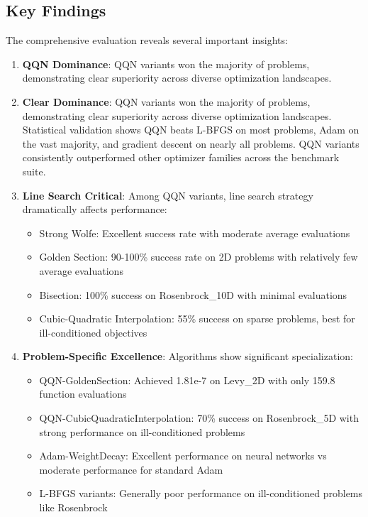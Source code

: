 \hypertarget{key-findings}{%
\subsection{Key Findings}\label{key-findings}}

The comprehensive evaluation reveals several important insights:

\begin{enumerate}
\def\labelenumi{\arabic{enumi}.}
\item
  \textbf{QQN Dominance}: QQN variants won the majority of problems, demonstrating clear superiority across diverse optimization landscapes.
\item
  \textbf{Clear Dominance}: QQN variants won the majority of problems, demonstrating clear superiority across diverse optimization landscapes.
  Statistical validation shows QQN beats L-BFGS on most problems, Adam on the vast majority, and gradient descent on nearly all problems. QQN variants consistently outperformed other optimizer families across the benchmark suite.
\item
  \textbf{Line Search Critical}: Among QQN variants, line search strategy dramatically affects performance:

  \begin{itemize}
  \tightlist
  \item
    Strong Wolfe: Excellent success rate with moderate average evaluations
  \item
    Golden Section: 90-100\% success rate on 2D problems with relatively few average evaluations
  \item
    Bisection: 100\% success on Rosenbrock\_10D with minimal evaluations
  \item
    Cubic-Quadratic Interpolation: 55\% success on sparse problems, best for ill-conditioned objectives
  \end{itemize}
\item
  \textbf{Problem-Specific Excellence}: Algorithms show significant specialization:

  \begin{itemize}
  \tightlist
  \item
    QQN-GoldenSection: Achieved 1.81e-7 on Levy\_2D with only 159.8 function evaluations
  \item
    QQN-CubicQuadraticInterpolation: 70\% success on Rosenbrock\_5D with strong performance on ill-conditioned problems
  \item
    Adam-WeightDecay: Excellent performance on neural networks vs moderate performance for standard Adam
  \item
    L-BFGS variants: Generally poor performance on ill-conditioned problems like Rosenbrock
  \end{itemize}
\end{enumerate}

